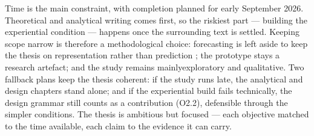 Time is the main constraint, with completion planned for early September 2026. Theoretical and analytical writing comes first, so the riskiest part --- building the experiential condition --- happens once the surrounding text is settled. Keeping scope narrow is therefore a methodological choice: forecasting is left aside to keep the thesis on representation rather than prediction \citep{sonnewald2021}; the prototype stays a research artefact; and the study remains mainlyexploratory and qualitative. Two fallback plans keep the thesis coherent: if the study runs late, the analytical and design chapters stand alone; and if the experiential build fails technically, the design grammar still counts as a contribution (O2.2), defensible through the simpler conditions. The thesis is ambitious but focused --- each objective matched to the time available, each claim to the evidence it can carry.

